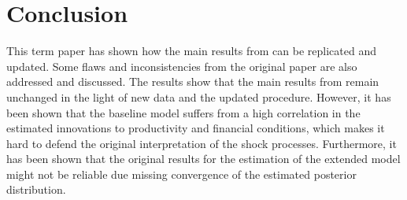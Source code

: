 
\section{Conclusion}
\label{sec:conclusion}

This term paper has shown how the main results from
\textcite{jerman_macroeconomic_2012} can be replicated and updated. Some flaws
and inconsistencies from the original paper are also addressed and
discussed. The results show that the main results from
\textcite{jerman_macroeconomic_2012} remain unchanged in the light of new data
and the updated procedure. However, it has been shown that the baseline model
suffers from a high correlation in the estimated innovations to productivity
and financial conditions, which makes it hard to defend the original
interpretation of the shock processes. Furthermore, it has been shown that the
original results for the estimation of the extended model might not be reliable
due missing convergence of the estimated posterior distribution.
